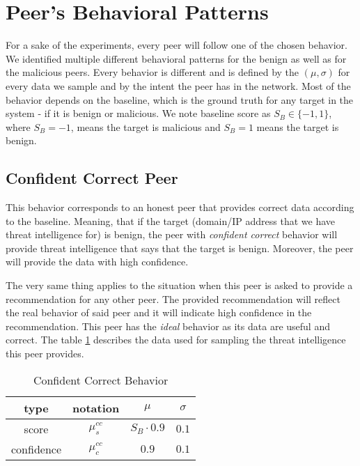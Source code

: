 \section{Peer's Behavioral Patterns}
\label{sec:peers-behavioral-patterns}
For a sake of the experiments, every peer will follow one of the chosen behavior.
We identified multiple different behavioral patterns for the benign as well as for the malicious peers.
Every behavior is different and is defined by the $(\mu, \sigma)$ for every data we sample and by the intent the peer has in the network.
Most of the behavior depends on the baseline, which is the ground truth for any target in the system - if it is benign or malicious.
We note baseline score as $S_{B} \in \{-1, 1\}$, where $S_{B} = -1$, means the target is malicious and $S_{B} = 1$ means the target is benign.


\subsection{Confident Correct Peer}
\label{subsubsec:confident-correct-peer}
This behavior corresponds to an honest peer that provides correct data according to the baseline. 
Meaning, that if the target (domain/IP address that we have threat intelligence for) is benign, the peer with \textit{confident correct} behavior will provide threat intelligence that says that the target is benign. 
Moreover, the peer will provide the data with high confidence.

The very same thing applies to the situation when this peer is asked to provide a recommendation for any other peer. 
The provided recommendation will reflect the real behavior of said peer and it will indicate high confidence in the recommendation.
This peer has the \textit{ideal} behavior as its data are useful and correct.
The table \ref{tab:confident-correct} describes the data used for sampling the threat intelligence this peer provides.

\begin{table}[!ht]
    \centering
    \begin{tabular}{c|c|c|c}
        type & notation & $\mu$ & $\sigma$ \\
        \hline
        score & $\mu^{cc}_{s}$ & $S_{B} \cdot 0.9$ & $0.1$ \\
        confidence & $\mu^{cc}_{c}$ &  $0.9$ & $0.1$ \\
    \end{tabular}
    \caption{Confident Correct Behavior}
    \label{tab:confident-correct}
\end{table}

